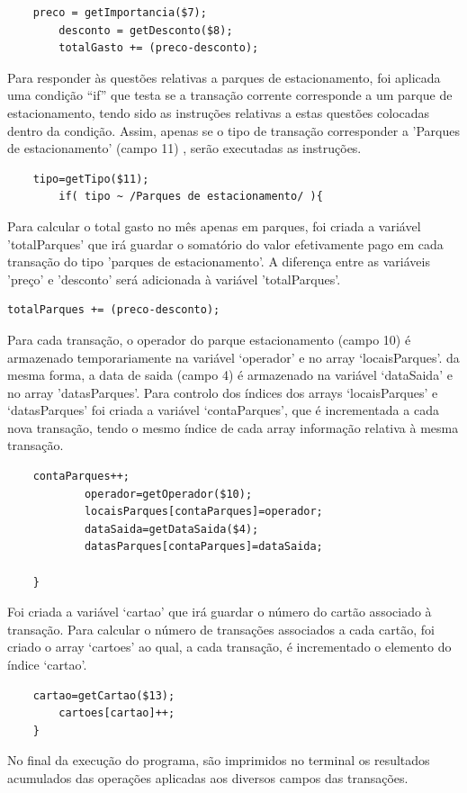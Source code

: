\documentclass{report}
\begin{document}
\begin{verbatim}
	preco = getImportancia($7);
		desconto = getDesconto($8);
		totalGasto += (preco-desconto);
\end{verbatim}
Para responder às questões relativas a parques de estacionamento, foi aplicada uma condição “if” que testa se a transação corrente corresponde a um parque de estacionamento, tendo sido as instruções relativas a estas questões colocadas dentro da condição. Assim, apenas se o tipo de transação corresponder a 'Parques de estacionamento' (campo 11) , serão executadas as instruções.
\begin{verbatim}
	tipo=getTipo($11);
		if( tipo ~ /Parques de estacionamento/ ){
\end{verbatim}
Para calcular o total gasto no mês apenas em parques, foi criada a variável 'totalParques' que irá guardar o somatório do valor efetivamente pago em cada transação do tipo 'parques de estacionamento'. A diferença entre as variáveis 'preço' e 'desconto' será adicionada à variável 'totalParques'.
\begin{verbatim}
totalParques += (preco-desconto);
\end{verbatim}
Para cada transação, o operador do parque estacionamento (campo 10) é armazenado temporariamente na variável ‘operador’ e no array ‘locaisParques’. da mesma forma, a data de saida (campo 4) é armazenado na variável ‘dataSaida’ e no array ’datasParques’. Para controlo dos índices dos arrays ‘locaisParques’ e ‘datasParques’ foi criada a variável ‘contaParques’, que é incrementada a cada nova transação, tendo o mesmo índice de cada array informação relativa à mesma transação.
\begin{verbatim}
	contaParques++;
	    	operador=getOperador($10);
	    	locaisParques[contaParques]=operador;
	    	dataSaida=getDataSaida($4);
	    	datasParques[contaParques]=dataSaida;

	}
\end{verbatim}
Foi criada a variável ‘cartao’ que irá guardar o número do cartão associado à transação. Para calcular o número de transações associados a cada cartão, foi criado o array ‘cartoes’ ao qual, a cada transação, é incrementado o elemento do índice ‘cartao’.
\begin{verbatim}
	cartao=getCartao($13);
		cartoes[cartao]++;
	}

\end{verbatim}
No final da execução do programa, são imprimidos no terminal os resultados acumulados das operações aplicadas aos diversos campos das transações.
\end{document}
